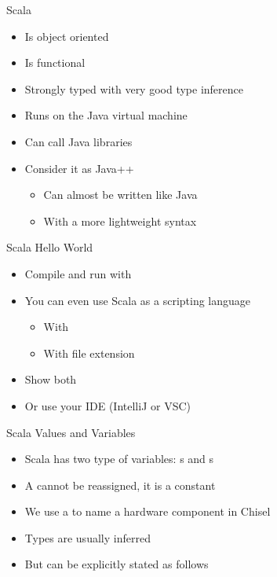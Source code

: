 \begin{frame}[fragile]{Scala}
\begin{itemize}
\item Is object oriented
\item Is functional
\item Strongly typed with very good type inference
\item Runs on the Java virtual machine
\item Can call Java libraries
\item Consider it as Java++
\begin{itemize}
\item Can almost be written like Java
\item With a more lightweight syntax
\end{itemize}
\end{itemize}
\end{frame}

\begin{frame}[fragile]{Scala Hello World}
\begin{itemize}
\item Compile and run with  
\item You can even use Scala as a scripting language
\begin{itemize}
\item With 
\item With file extension 
\end{itemize}
\item Show both
\item Or use your IDE (IntelliJ or VSC)
\end{itemize}
\end{frame}

\begin{frame}[fragile]{Scala Values and Variables}
\begin{itemize}
\item Scala has two type of variables: s and s
\item A  cannot be reassigned, it is a constant
\item We use a  to name a hardware component in Chisel
\end{itemize}
\begin{itemize}
\item Types are usually inferred
\item But can be explicitly stated as follows
\end{itemize}
\end{frame}

